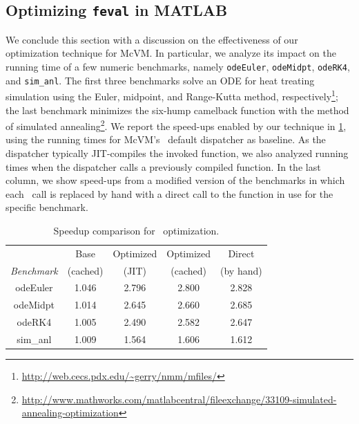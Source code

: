 \subsection{Optimizing {\tt feval} in MATLAB}
\label{sse:feval-results}
We conclude this section with a discussion on the effectiveness of our optimization technique for McVM. In particular, we analyze its impact on the running time of a few numeric benchmarks, namely {\tt odeEuler}, {\tt odeMidpt}, {\tt odeRK4}, and {\tt sim\_anl}. The first three benchmarks solve an ODE for heat treating simulation using the Euler, midpoint, and Range-Kutta method, respectively\footnote{\url{http://web.cecs.pdx.edu/~gerry/nmm/mfiles/}}; the last benchmark minimizes the six-hump camelback function with the method of simulated annealing\footnote{\url{http://www.mathworks.com/matlabcentral/fileexchange/33109-simulated-annealing-optimization}}. We report the speed-ups enabled by our technique in \mytable\ref{tab:feval}, using the running times for McVM's \feval\ default dispatcher as baseline. As the dispatcher typically JIT-compiles the invoked function, we also analyzed running times when the dispatcher calls a previously compiled function. In the last column, we show speed-ups from a modified version of the benchmarks in which each \feval\ call is replaced by hand with a direct call to the function in use for the specific benchmark.
  
\begin{table}
\begin{small}
    \begin{tabular}{ |c|c|c|c|c| }
        \cline{2-5}
        \multicolumn{1}{c|}{} & Base & Optimized & Optimized & Direct \\ 
        \cline{1-1}
        {\em Benchmark} & (cached) & (JIT) & (cached) & (by hand) \\
        \hline
        \hline
        odeEuler & 1.046 & 2.796 & 2.800 & 2.828 \\ 
        \hline
        odeMidpt & 1.014 & 2.645 & 2.660 & 2.685 \\ 
        \hline
        odeRK4 & 1.005 & 2.490 & 2.582 & 2.647 \\ 
        \hline
        sim\_anl & 1.009 & 1.564 & 1.606 & 1.612 \\ 
        \hline
    \end{tabular} 
    \caption{\label{tab:feval} Speedup comparison for \feval\ optimization.} 
\end{small}
\end{table}  
  
